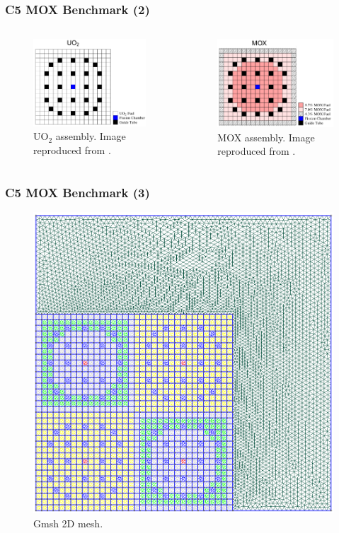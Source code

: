 \begin{frame}
\frametitle{C5 MOX Benchmark (2)}

\begin{columns}
    \column[t]{5.5cm}
    \begin{figure}[htbp!]
        \begin{center}
            \includegraphics[width=5.5cm]{figures/bench-config2}
        \end{center}
        \caption{UO$_2$ assembly. Image reproduced from \cite{capilla_applications_2009}.}
    \end{figure}

    \column[t]{5.5cm}
    \begin{figure}[htbp!]
        \begin{center}
            \includegraphics[width=5.5cm]{figures/bench-config3}
        \end{center}
        \caption{MOX assembly. Image reproduced from \cite{capilla_applications_2009}.}
    \end{figure}
\end{columns}
\end{frame}


\begin{frame}
\frametitle{C5 MOX Benchmark (3)}

    \begin{figure}[htbp!]
        \begin{center}
            \includegraphics[width=6.cm]{figures/bench-mesh}
        \end{center}
        \caption{Gmsh 2D mesh.}
    \end{figure}

\end{frame}

